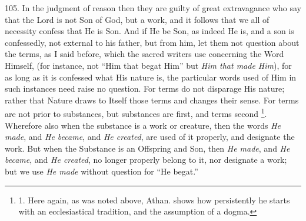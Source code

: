 105. In the judgment of reason
then they are guilty of great extravagance who say that the Lord is
not Son of God, but a work, and it follows that we all of necessity
confess that He is Son. And if He be Son, as indeed He is, and a son
is confessedly, not external to his father, but from him, let them not
question about the terms, as I said before, which the sacred writers
use concerning the Word Himself, (for instance, not ``Him that begat
Him'' but \emph{Him that made Him}), for as long as it is confessed
what His nature is, the particular words used of Him in such instances
need raise no question. For terms do not disparage His nature; rather
that Nature draws to Itself those terms and changes their sense. For
terms are not prior to substances, but substances are first, and terms
second \footnote{

1. Here again, as was noted
above, Athan. shows how persistently he starts with an ecclesiastical
tradition, and the assumption of a dogma.}. Wherefore also
when the substance is a work or creature, then the words \emph{He made},
and \emph{He became}, and \emph{He created}, are used of it properly,
and designate the work. But when the Substance is an Offspring and
Son, then \emph{He made}, and \emph{He became}, and \emph{He created},
no longer properly belong to it, nor designate a work; but we use \emph{He
made} without question for ``He begat.''

